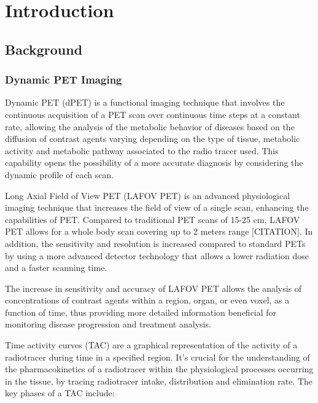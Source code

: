 
\chapter{Introduction}\label{chapter:introduction}

\section{Background}

\subsection{Dynamic PET Imaging}

Dynamic PET (dPET) is a functional imaging technique that involves the  continuous acquisition of a PET scan over continuous time steps at a constant rate, allowing the analysis of the metabolic behavior of diseases based on the diffusion of contrast agents varying depending on the type of tissue, metabolic activity and metabolic pathway associated to the radio tracer used. This capability opens the possibility of a more accurate diagnosis by considering the dynamic profile of each scan.

Long Axial Field of View PET (LAFOV PET) is an advanced physiological imaging technique that increases the field of view of a single scan, enhancing the capabilities of PET. Compared to traditional PET scans of 15-25 cm, LAFOV PET allows for a whole body scan covering up to 2 meters range [CITATION]. In addition, the sensitivity and resolution is increased compared to standard PETs by using a more advanced detector technology that allows a lower radiation dose and a faster scanning time.

The increase in sensitivity and accuracy of LAFOV PET allows the analysis of concentrations of contrast agents within a region, organ, or even voxel, as a function of time, thus providing more detailed information beneficial for monitoring disease progression and treatment analysis.

Time activity curves (TAC) are a graphical representation of the activity of a radiotracer during time in a specified region. It’s crucial for the understanding of the pharmacokinetics of a radiotracer within the physiological processes occurring in the tissue, by tracing radiotracer intake, distribution and elimination rate. The key phases of a TAC include:

